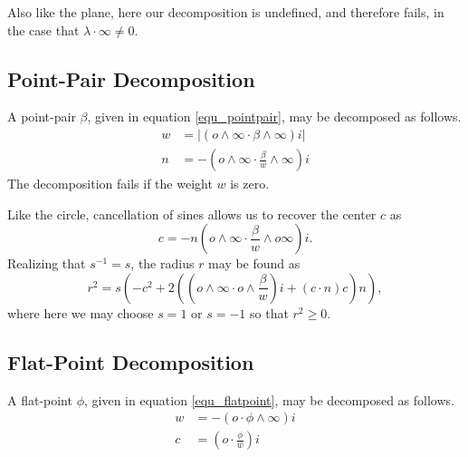 \documentclass[12pt]{article}
\newcommand{\nvao}{o}
\newcommand{\nvai}{\infty}
\begin{document}
Also like the plane, here our decomposition is undefined,
and therefore fails, in the case that $\lambda\cdot\nvai\neq 0$.

\subsection{Point-Pair Decomposition}

A point-pair $\beta$, given in equation \eqref{equ_pointpair}, may be
decomposed as follows.
\begin{align}
w &= |(\nvao\wedge\nvai\cdot\beta\wedge\nvai)i| \\
n &= -\left(\nvao\wedge\nvai\cdot\frac{\beta}{w}\wedge\nvai\right)i
\end{align}
The decomposition fails if the weight $w$ is zero.

Like the circle, cancellation of sines allows us to recover the center $c$ as
\begin{equation}
c = -n\left(\nvao\wedge\nvai\cdot\frac{\beta}{w}\wedge\nvao\nvai\right)i.
\end{equation}
Realizing that $s^{-1}=s$, the radius $r$ may be found as
\begin{equation}
r^2 = s\left(-c^2 + 2\left(\left(\nvao\wedge\nvai\cdot\nvao\wedge\frac{\beta}{w}\right)i+(c\cdot n)c\right)n\right),
\end{equation}
where here we may choose $s=1$ or $s=-1$ so that $r^2\geq 0$.

\subsection{Flat-Point Decomposition}

A flat-point $\phi$, given in equation \eqref{equ_flatpoint}, may be decomposed as follows.
\begin{align}
w &= -(\nvao\cdot\phi\wedge\nvai)i \\
c &= \left(\nvao\cdot\frac{\phi}{w}\right)i
\end{align}
\end{document}
